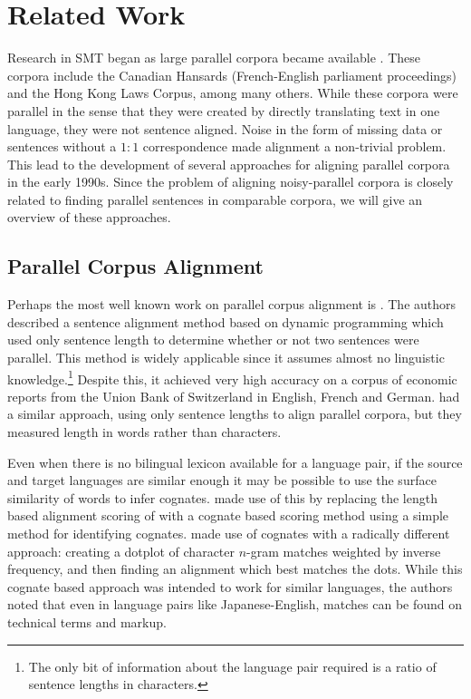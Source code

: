 \chapter{Related Work}
\label{chap:related_work}

Research in SMT began as large parallel corpora became available
\citep{Brown88,Brown90,Brown93}. These corpora include the Canadian Hansards
(French-English parliament proceedings) and the Hong Kong Laws Corpus, among many
others. While these corpora were parallel in the sense that they were created by
directly translating text in one language, they were not sentence aligned. Noise
in the form of missing data or sentences without a $1:1$ correspondence made
alignment a non-trivial problem. This lead to the development of several
approaches for aligning parallel corpora in the early 1990s. Since the problem
of aligning noisy-parallel corpora is closely related to finding parallel
sentences in comparable corpora, we will give an
overview of these approaches.

\section{Parallel Corpus Alignment}
\label{sec:parallel_related}

Perhaps the most well known work on parallel corpus alignment is \citet{Gale91,Gale93}.
The authors described a sentence alignment method based on dynamic programming
which used only sentence length to determine whether or not two sentences were
parallel. This method is widely applicable since it assumes almost no linguistic
knowledge.\footnote{The only bit of information about the language pair required
is a ratio of sentence lengths in characters.} Despite this, it achieved very
high accuracy on a corpus of economic reports from the Union Bank of Switzerland
in English, French and German. \citet{Brown91} had a similar approach, using
only sentence lengths to align parallel corpora, but they measured length in
words rather than characters.

Even when there is no bilingual lexicon available for a language pair, if the
source and target languages are similar enough it may be possible to use the
surface similarity of words to infer cognates. \citet{Simard93} made use of this
by replacing the length based alignment scoring of \citet{Gale93} with a cognate
based scoring method using a simple method for identifying cognates.
\citet{Church93} made use of cognates with a radically different approach:
creating a dotplot of character $n$-gram matches weighted by inverse frequency,
and then finding an alignment which best matches the dots. While this cognate
based approach was intended to work for similar languages, the authors noted
that even in language pairs like Japanese-English, matches can be found on
technical terms and markup.

